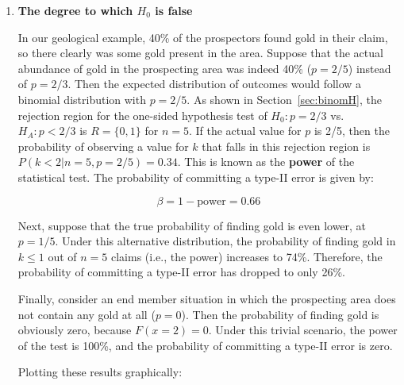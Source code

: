 \begin{enumerate}
\item{\bf The degree to which $H_0$ is false}
  
  In our geological example, 40\% of the prospectors found gold in
  their claim, so there clearly was some gold present in the
  area. Suppose that the actual abundance of gold in the prospecting
  area was indeed 40\% ($p=2/5$) instead of $p=2/3$.  Then the
  expected distribution of outcomes would follow a binomial
  distribution with $p=2/5$. As shown in Section~\ref{sec:binomH}, the
  rejection region for the one-sided hypothesis test of $H_0: p=2/3$
  vs. $H_{\!A}: p<2/3$ is $R=\{0,1\}$ for $n=5$. If the actual value
  for $p$ is 2/5, then the probability of observing a value for $k$
  that falls in this rejection region is $P(k<2|n=5,p=2/5)=0.34$. This
  is known as the \textbf{power} of the statistical test. The
  probability of committing a type-II error is given by:
  
  \begin{equation}
    \beta = 1 - \mbox{power} = 0.66
  \end{equation}

  Next, suppose that the true probability of finding gold is even
  lower, at $p=1/5$. Under this alternative distribution, the
  probability of finding gold in ${k}\leq{1}$ out of $n=5$ claims
  (i.e., the power) increases to 74\%. Therefore, the probability of
  committing a type-II error has dropped to only 26\%.

  Finally, consider an end member situation in which the prospecting
  area does not contain any gold at all ($p=0$). Then the probability
  of finding gold is obviously zero, because $F(x=2)=0$. Under this
  trivial scenario, the power of the test is 100\%, and the
  probability of committing a type-II error is zero.

  Plotting these results graphically:


\end{enumerate}
